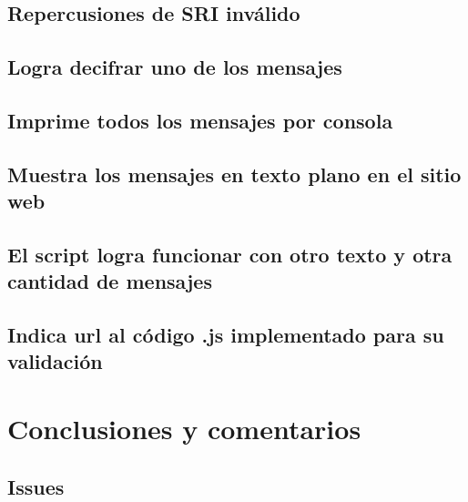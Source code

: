 \documentclass[letter,12pt]{article}
\begin{document}
\subsection{Repercusiones de SRI inválido}

\subsection{Logra decifrar uno de los mensajes}

\subsection{Imprime todos los mensajes por consola}

\subsection{Muestra los mensajes en texto plano en el sitio web}

\subsection{El script logra funcionar con otro texto y otra cantidad de mensajes}

\subsection{Indica url al código .js implementado para su validación}

\section*{Conclusiones y comentarios}

\subsection*{Issues}
\end{document}
